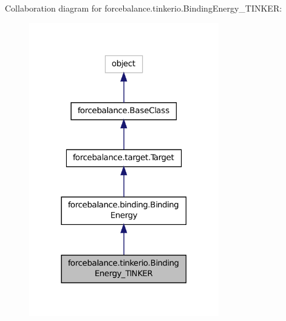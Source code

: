 Collaboration diagram for forcebalance.\-tinkerio.\-Binding\-Energy\-\_\-\-T\-I\-N\-K\-E\-R\-:
\nopagebreak
\begin{figure}[H]
\begin{center}
\leavevmode
\includegraphics[width=234pt]{classforcebalance_1_1tinkerio_1_1BindingEnergy__TINKER__coll__graph}
\end{center}
\end{figure}
